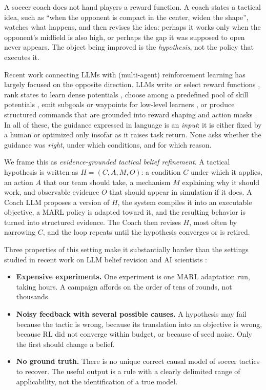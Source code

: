 \documentclass[11pt]{article}
\begin{document}
A soccer coach does not hand players a reward function.
A coach states a tactical idea, such as ``when the opponent is compact in the center, widen the shape'', watches what happens, and then revises the idea: perhaps it works only when the opponent's midfield is also high, or perhaps the gap it was supposed to open never appears.
The object being improved is the \emph{hypothesis}, not the policy that executes it.

Recent work connecting LLMs with (multi-agent) reinforcement learning has largely focused on the opposite direction.
LLMs write or select reward functions \citep{ma2024eureka,incentive2026,maestro2025}, rank states to learn dense potentials \citep{lin2025lca}, choose among a predefined pool of skill potentials \citep{ma2025vgepf}, emit subgoals or waypoints for low-level learners \citep{l2m2_2025,yano2025icco}, or produce structured commands that are grounded into reward shaping and action masks \citep{lehca2026}.
In all of these, the guidance expressed in language is an \emph{input}: it is either fixed by a human or optimized only insofar as it raises task return.
None asks whether the guidance was \emph{right}, under which conditions, and for which reason.

We frame this as \emph{evidence-grounded tactical belief refinement}.
A tactical hypothesis is written as $H=(C,A,M,O)$: a condition $C$ under which it applies, an action $A$ that our team should take, a mechanism $M$ explaining why it should work, and observable evidence $O$ that should appear in simulation if it does.
A Coach LLM proposes a version of $H$, the system compiles it into an executable objective, a MARL policy is adapted toward it, and the resulting behavior is turned into structured evidence.
The Coach then revises $H$, most often by narrowing $C$, and the loop repeats until the hypothesis converges or is retired.

Three properties of this setting make it substantially harder than the settings studied in recent work on LLM belief revision and AI scientists \citep{evoscm2026,labloop2026}:
\begin{itemize}[leftmargin=*,itemsep=2pt]
  \item \textbf{Expensive experiments.} One experiment is one MARL adaptation run, taking hours.
    A campaign affords on the order of tens of rounds, not thousands.
  \item \textbf{Noisy feedback with several possible causes.} A hypothesis may fail because the tactic is wrong, because its translation into an objective is wrong, because RL did not converge within budget, or because of seed noise.
    Only the first should change a belief.
  \item \textbf{No ground truth.} There is no unique correct causal model of soccer tactics to recover.
    The useful output is a rule with a clearly delimited range of applicability, not the identification of a true model.
\end{itemize}
\end{document}
